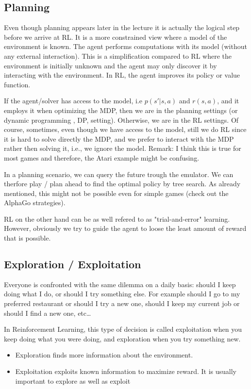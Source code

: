 \documentclass[main]{subfiles}
\begin{document}
\subsection{Planning}
Even though planning appears later in the lecture it is actually the logical step before we arrive at RL. It is  a more constrained view where a model of the environment is known. 
The agent performs computations with its model (without any external interaction). 
This is a simplification compared to RL where the environment is initially unknown and the agent may only discover it by interacting with the environment. 
In RL, the agent improves its policy or value function.


If the agent/solver has access to the model, i.e $p(s'|s,a)$ and $r(s,a)$, and it employs it when optimizing the MDP, then we are in the planning settings (or dynamic programming , DP, setting). Otherwise, we are in the RL settings. Of course, sometimes, even though we have access to the model, still we do RL since it is hard to solve directly the MDP, and we prefer to interact with the MDP rather then solving it, i.e., we ignore the model. Remark: I think this is true for most games and therefore, the Atari example might be confusing.


In a planning scenario, we can query the future trough the emulator. We can therfore play / plan ahead to find the optimal policy by tree search. As already mentioned, this might not be possible even for simple games (check out the AlphaGo strategies).

RL on the other hand can be as well refered to as "trial-and-error" learning. However, obviously we try to guide the agent to loose the least amount of reward that is possible.

\subsection{Exploration / Exploitation}
Everyone is confronted with the same dilemma on a daily basis: should I keep doing what I do, or should I try something else.
For example should I go to my preferred restaurant or should I try a new one, should I keep my current job or should I find a new one, etc…

In Reinforcement Learning, this type of decision is called exploitation when you keep doing what you were doing, and exploration when you try something new.

\begin{itemize}
    \item Exploration finds more information about the environment. 
    \item Exploitation exploits known information to maximize reward. It is usually important to explore as well as exploit
\end{itemize}
\end{document}

